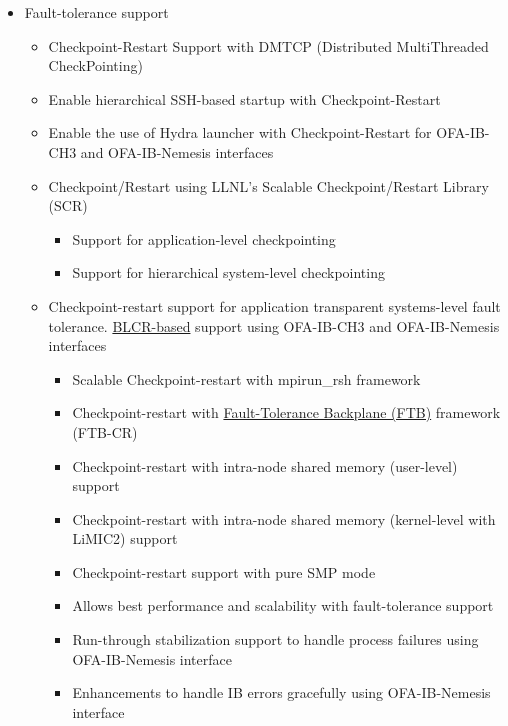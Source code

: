 \begin{itemize}
  \item 
    Fault-tolerance support
    \begin{itemize}
      \item Checkpoint-Restart Support with DMTCP (Distributed MultiThreaded CheckPointing)
      \item Enable hierarchical SSH-based startup with Checkpoint-Restart
      \item Enable the use of Hydra launcher with
		Checkpoint-Restart for OFA-IB-CH3 and OFA-IB-Nemesis interfaces
      \item  Checkpoint/Restart using LLNL's Scalable Checkpoint/Restart Library (SCR)
        \begin{itemize}
        \item  Support for application-level checkpointing
        \item  Support for hierarchical system-level checkpointing
        \end{itemize}
      \item  Checkpoint-restart support for application transparent
      systems-level fault tolerance. 
      \href{http://ftg.lbl.gov/CheckpointRestart/CheckpointRestart.shtml}{BLCR-based} 
      support using OFA-IB-CH3 and OFA-IB-Nemesis interfaces
        \begin{itemize}
          \item  Scalable Checkpoint-restart with 
               mpirun\_rsh framework 
          \item  Checkpoint-restart with
                 \href{http://www.mcs.anl.gov/research/cifts/index.php}{
                   Fault-Tolerance Backplane (FTB)} framework (FTB-CR)
          \item  Checkpoint-restart with 
               intra-node shared memory (user-level) support
          \item  Checkpoint-restart with 
               intra-node shared memory (kernel-level with LiMIC2) support
          \item  Checkpoint-restart 
               support with pure SMP mode 
          \item  Allows best performance and scalability with fault-tolerance
               support
          \item  Run-through stabilization support to handle process failures using OFA-IB-Nemesis interface
          \item  Enhancements to handle IB errors gracefully using OFA-IB-Nemesis interface
        \end{itemize}

\end{itemize}
\end{itemize}
